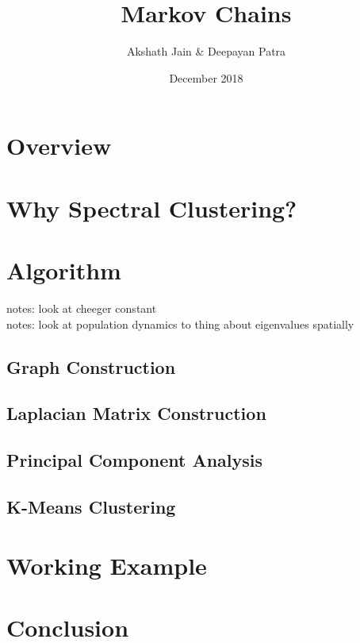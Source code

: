 \documentclass{article}
\title{Markov Chains}
\author{Akshath Jain \& Deepayan Patra}
\date{December 2018}
\begin{document}
\maketitle

\section{Overview}

\section{Why Spectral Clustering?}

\section{Algorithm}
notes: look at cheeger constant\\
notes: look at population dynamics to thing about eigenvalues spatially
\subsection{Graph Construction}
\subsection{Laplacian Matrix Construction}
\subsection{Principal Component Analysis}
\subsection{K-Means Clustering}

\section{Working Example}

\section{Conclusion}



\end{document}
